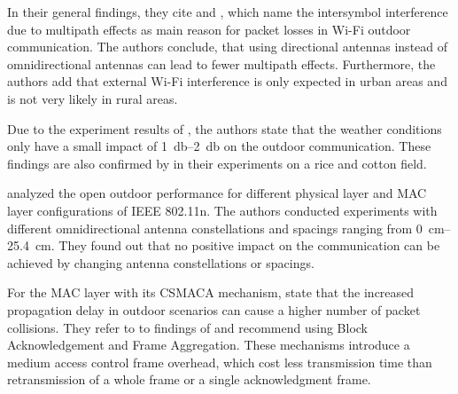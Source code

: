 In their general findings, they cite \cite{sheth_packet_2007} and \cite{aguayo_link-level_2004}, which name the intersymbol
interference due to multipath effects as main reason for packet losses in Wi-Fi outdoor communication. The authors conclude,
that using directional antennas instead of omnidirectional antennas can lead to fewer multipath effects. Furthermore, the authors add
that external Wi-Fi interference is only expected in urban areas and is not very likely in rural areas.

Due to the experiment results of \cite{chebrolu_long-distance_2006}, the authors state that the weather conditions only have a
small impact of \SIrange{1}{2}{\decibel} on the outdoor communication. These findings are also confirmed by \cite{brinkhoff_characterization_2017}
in their experiments on a rice and cotton field.

\textcite{paul_characterizing_2011} analyzed the open outdoor performance for different physical layer and MAC layer configurations of
IEEE 802.11n. The authors conducted experiments with different omnidirectional antenna constellations and spacings ranging from
\SIrange{0}{25.4}{\centi\metre}. They found out that no positive impact on the communication can be achieved by
changing antenna constellations or spacings.

For the MAC layer with its \ac{CSMACA} mechanism, \textcite{aust_outdoor_2015} state that the increased propagation delay in outdoor scenarios
can cause a higher number of packet collisions. They refer to to findings of \cite{paul_characterizing_2011} and recommend
using Block Acknowledgement and Frame Aggregation. These mechanisms introduce a medium access control frame overhead, which cost less transmission time than
retransmission of a whole frame or a single acknowledgment frame.

